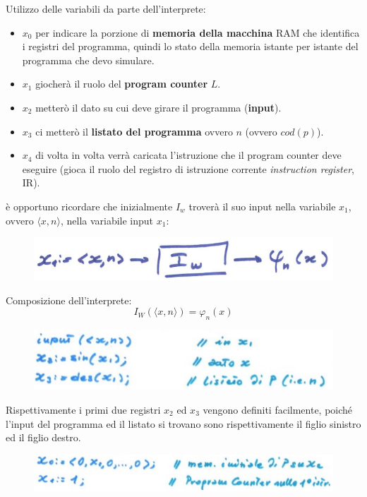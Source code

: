\documentclass{article}
\begin{document}
Utilizzo delle variabili da parte dell'interprete:
\begin{itemize}
    \item $x_0$ per indicare la porzione di \textbf{memoria della macchina} RAM
          che identifica i registri del programma, quindi lo stato della memoria istante
          per istante del programma che devo simulare.
    \item $x_1$ giocherà il ruolo del \textbf{program counter} $L$.
    \item $x_2$ metterò il dato su cui deve girare il programma (\textbf{input}).
    \item $x_3$ ci metterò il \textbf{listato del programma} ovvero $n$ (ovvero $cod(p)$).
    \item $x_4$ di volta in volta verrà caricata l'istruzione che il
          program counter deve eseguire (gioca il ruolo del registro di istruzione
          corrente \textit{instruction register}, IR).
\end{itemize}
è opportuno ricordare che inizialmente $I_w$ troverà il suo input nella variabile
$x_1$, ovvero $\langle x,n\rangle$, nella variabile input $x_1$:
\begin{figure}[H]
    \centering
    \includegraphics[scale=0.5]{images/x_1.png}
\end{figure}
Composizione dell'interprete:
$$I_W(\langle x,n\rangle)=\varphi_n(x)$$
\begin{figure}[H]
    \centering
    \includegraphics[scale=0.5]{images/inter_0.png}
\end{figure}
Rispettivamente i primi due registri $x_2$ ed $x_3$ vengono definiti facilmente, poiché
l'input del programma ed il listato si trovano sono rispettivamente il figlio sinistro
ed il figlio destro.
\begin{figure}[H]
    \centering
    \includegraphics[scale=0.5]{images/inter_1.png}
\end{figure}
\end{document}

